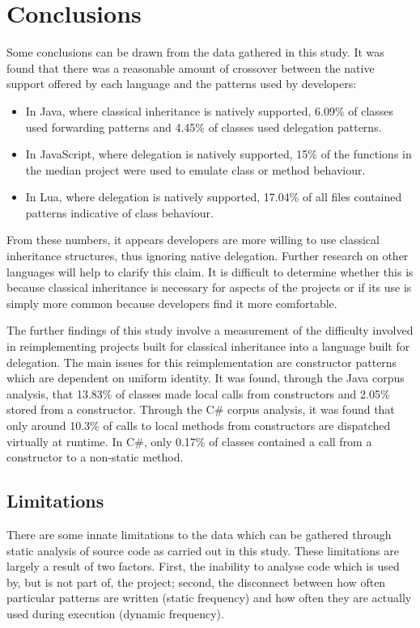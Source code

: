 \chapter{Conclusions}\label{C:con}
Some conclusions can be drawn from the data gathered in this study. It was found that there was a reasonable amount of crossover between the native support offered by each language and the patterns used by developers:
\begin{itemize}
	\item In Java, where classical inheritance is natively supported, 6.09\% of classes used forwarding patterns and 4.45\% of classes used delegation patterns.
	\item In JavaScript, where delegation is natively supported, 15\% of the functions in the median project were used to emulate class or method behaviour.
	\item In Lua, where delegation is natively supported, 17.04\% of all files contained patterns indicative of class behaviour.
\end{itemize}
From these numbers, it appears developers are more willing to use classical inheritance structures, thus ignoring native delegation. Further research on other languages will help to clarify this claim. It is difficult to determine whether this is because classical inheritance is necessary for aspects of the projects or if its use is simply more common because developers find it more comfortable.
\newline

The further findings of this study involve a measurement of the difficulty involved in reimplementing projects built for classical inheritance into a language built for delegation. The main issues for this reimplementation are constructor patterns which are dependent on uniform identity. It was found, through the Java corpus analysis, that 13.83\% of classes made local calls from constructors and 2.05\% stored  from a constructor. Through the C\# corpus analysis, it was found that only around 10.3\% of calls to local methods from constructors are dispatched virtually at runtime. In C\#, only 0.17\% of classes contained a call from a constructor to a non-static method.

\section{Limitations}
There are some innate limitations to the data which can be gathered through static analysis of source code as carried out in this study. These limitations are largely a result of two factors. First, the inability to analyse code which is used by, but is not part of, the project; second, the disconnect between how often particular patterns are written (static frequency) and how often they are actually used during execution (dynamic frequency).

